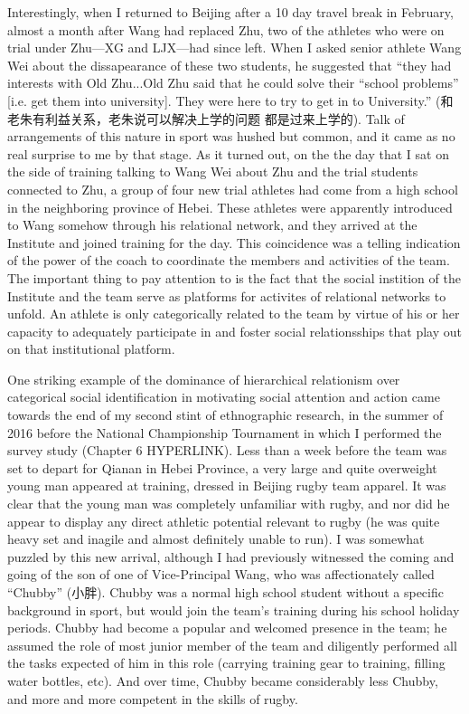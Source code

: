Interestingly, when I returned to Beijing after a 10 day travel break in February, almost a month after Wang had replaced Zhu, two of the athletes who were on trial under Zhu---XG and LJX---had since left.  When I asked senior athlete Wang Wei about the dissapearance of these two students, he suggested that ``they had interests with Old Zhu...Old Zhu said that he could solve their ``school problems'' [i.e. get them into university]. They were here to try to get in to University.'' (和老朱有利益关系，老朱说可以解决上学的问题 都是过来上学的). Talk of arrangements of this nature in sport was hushed but common, and it came as no real surprise to me by that stage.  As it turned out, on the the day that I sat on the side of training talking to Wang Wei about Zhu and the trial students connected to Zhu, a group of four new trial athletes had come from a high school in the neighboring province of Hebei.  These athletes were apparently introduced to Wang somehow through his relational network, and they arrived at the Institute and joined training for the day. This coincidence was a telling indication of the power of the coach to coordinate the members and activities of the team. The important thing to pay attention to is the fact that the social instition of the Institute and the team serve as platforms for activites of relational networks to unfold. An athlete is only categorically related to the team by virtue of his or her capacity to adequately participate in and foster social relationsships that play out on that institutional platform.

One striking example of the dominance of hierarchical relationism over categorical social identification in motivating social attention and action came towards the end of my second stint of ethnographic research, in the summer of 2016 before the National Championship Tournament in which I performed the survey study (Chapter 6 HYPERLINK).  Less than a week before the team was set to depart for Qianan in Hebei Province, a very large and quite overweight young man appeared at training, dressed in Beijing rugby team apparel.  It was clear that the young man was completely unfamiliar with rugby, and nor did he appear to display any direct athletic potential relevant to rugby (he was quite heavy set and inagile and almost definitely unable to run).  I was somewhat puzzled by this new arrival, although I had previously witnessed the coming and going of the son of one of Vice-Principal Wang, who was affectionately called ``Chubby'' (小胖).
Chubby was a normal high school student without a specific background in sport, but would join the team's training during his school holiday periods.  Chubby had become a popular and welcomed presence in the team; he assumed the role of most junior member of the team and diligently performed all the tasks expected of him in this role (carrying training gear to training, filling water bottles, etc).  And over time, Chubby became considerably less Chubby, and more and more competent in the skills of rugby.

